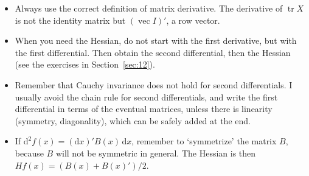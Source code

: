 \documentclass[12pt,a4paper]{article}
\theoremstyle{definition}
\DeclareMathOperator{\tr}{tr}
\DeclareMathOperator{\avec}{vec}
\newcommand{\dd}{\mathrm{d}}
\begin{document}
\begin{itemize}
\item Always use the correct definition of matrix derivative. The derivative of $\tr X$ is not the identity matrix but $(\avec I)'$, a row vector. %
\item When you need the Hessian, do not start with the first derivative, but with the first differential. Then obtain the second differential, then the Hessian (see the exercises in Section~\ref{sec:12}). %
\item Remember that Cauchy invariance does not hold for second differentials. I usually avoid the chain rule for second differentials, and write the first differential in terms of the eventual matrices, unless there is linearity (symmetry, diagonality), which can be safely added at the end. %
\item If $\dd^2 f(x) = (\dd x)' B(x)\, \dd x$, remember to `symmetrize' the matrix $B$, because $B$ will not be symmetric in general. The Hessian is then $Hf(x) = (B(x) + B(x)')/2$. %
\end{itemize}

%
%
%
\end{document}
